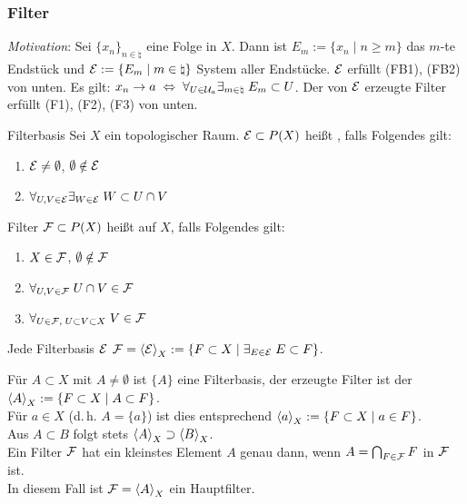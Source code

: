 \pagebreak

\subsubsection{%
    Filter%
}

\emph{Motivation}:
Sei $\{x_n\}_{n \in \natural}$ eine Folge in $X$.
Dann ist $E_m := \{x_n \;|\; n \ge m\}$ das $m$-te Endstück
und $\mathcal{E} := \{E_m \;|\; m \in \natural\}$ System aller Endstücke.
$\mathcal{E}$ erfüllt (FB1), (FB2) von unten.
Es gilt: $x_n \to a \;\Leftrightarrow\;
\forall_{U \in \mathcal{U}_a} \exists_{m \in \natural}\; E_m \subset U$.
Der von $\mathcal{E}$ erzeugte Filter erfüllt (F1), (F2), (F3) von unten.

\begin{Def}{Filterbasis}
    Sei $X$ ein topologischer Raum.
    $\mathcal{E} \subset P(X)$ heißt , falls Folgendes gilt:
    \begin{enumerate}[label=(FB\arabic*)]
        \item
        $\mathcal{E} \not= \emptyset$, $\emptyset \notin \mathcal{E}$

        \item
        $\forall_{U, V \in \mathcal{E}} \exists_{W \in \mathcal{E}}\; W \subset U \cap V$
    \end{enumerate}
\end{Def}

\begin{Def}{Filter}
    $\mathcal{F} \subset P(X)$ heißt  auf $X$, falls Folgendes gilt:
    \begin{enumerate}[label=(F\arabic*)]
        \item
        $X \in \mathcal{F}$, $\emptyset \notin \mathcal{F}$

        \item
        $\forall_{U, V \in \mathcal{F}}\; U \cap V \in \mathcal{F}$

        \item
        $\forall_{U \in \mathcal{F},\; U \subset V \subset X}\; V \in \mathcal{F}$
    \end{enumerate}
    Jede Filterbasis $\mathcal{E}$ 
    $\mathcal{F} = \left\langle{\ensuremath{\mathcal{E}}}\right\rangle_X := \{F \subset X \;|\;
    \exists_{E \in \mathcal{E}}\; E \subset F\}$.
\end{Def}

\linie

\begin{Bsp}
    Für $A \subset X$ mit $A \not= \emptyset$ ist $\{A\}$ eine Filterbasis,
    der erzeugte Filter ist der 
    $\left\langle{A}\right\rangle_X := \{F \subset X \;|\; A \subset F\}$. \\
    Für $a \in X$ (d.\,h. $A = \{a\}$) ist dies entsprechend
    $\left\langle{a}\right\rangle_X := \{F \subset X \;|\; a \in F\}$. \\
    Aus $A \subset B$ folgt stets $\left\langle{A}\right\rangle_X \supset \left\langle{B}\right\rangle_X$. \\
    Ein Filter $\mathcal{F}$ hat ein kleinstes Element $A$ genau dann, wenn
    $A = \bigcap_{F \in \mathcal{F}} F$ in $\mathcal{F}$ ist. \\
    In diesem Fall ist $\mathcal{F} = \left\langle{A}\right\rangle_X$ ein Hauptfilter.
\end{Bsp}

